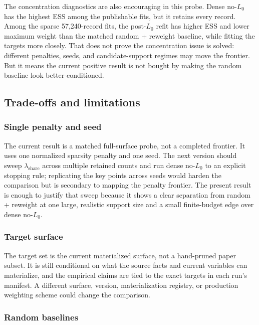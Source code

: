 The concentration diagnostics are also encouraging in this probe. Dense no-$L_0$ has the highest ESS among
the publishable fits, but it retains every record. Among the sparse 57{,}240-record fits, the post-$L_0$
refit has higher ESS and lower maximum weight than the matched random + reweight baseline, while fitting
the targets more closely. That does not prove the concentration issue is solved: different penalties,
seeds, and candidate-support regimes may move the frontier. But it means the current positive result is
not bought by making the random baseline look better-conditioned.

\subsection{Trade-offs and limitations}

\subsubsection{Single penalty and seed}

The current result is a matched full-surface probe, not a completed frontier. It uses one normalized
sparsity penalty and one seed. The next version should sweep $\lambda_{\mathrm{share}}$ across multiple
retained counts and run dense no-$L_0$ to an explicit stopping rule; replicating the key points across
seeds would harden the comparison but is secondary to mapping the penalty frontier. The present result is
enough to justify that sweep because it shows
a clear separation from random + reweight at one large, realistic support size and a small finite-budget
edge over dense no-$L_0$.

\subsubsection{Target surface}

The target set is the current materialized \populace{} surface, not a hand-pruned paper subset. It is still
conditional on what the source facts and current \policyengine{} variables can materialize, and the empirical
claims are tied to the exact targets in each run's manifest. A different \chronicle{} surface, \policyengine{}
version, materialization registry, or production weighting scheme could change the comparison.

\subsubsection{Random baselines}


